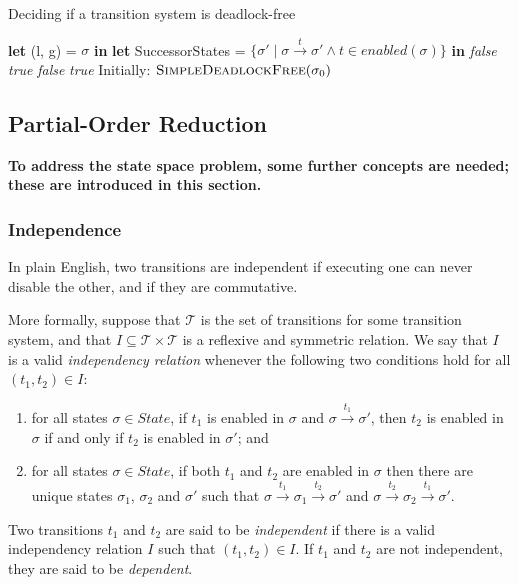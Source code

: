 \documentclass[12pt,a4paper,twoside,openright]{report}
\newcommand{\Let}[2]{\State \textbf{let} #1 = #2 \textbf{in}}
\begin{document}
\begin{algorithm} \caption{Deciding if a transition system is deadlock-free}
	\label{simple-deadlock-free} \begin{algorithmic}[1]
		\Let{(l, g)}{$\sigma$}
		\Let{SuccessorStates}{$\{\sigma' \mid \sigma \xrightarrow{t}
			\sigma' \wedge t \in \textit{enabled}(\sigma)\}$}
				 \Return \textit{false}
				\EndIf
			\EndFor
			\State \Return \textit{true}
		\Else
					\Return \textit{false}
				\EndIf
			\EndFor
		\State \Return \textit{true}
		\EndIf
		\EndProcedure
		\State
		\State Initially: $\textsc{SimpleDeadlockFree}(\sigma_0)$
	\end{algorithmic}
\end{algorithm}

\subsection{Partial-Order Reduction}
\textbf{To address the state space problem,
	some further concepts are needed; these
	are introduced in this section.}

\subsubsection{Independence} \label{sec:independence}
In plain English, two transitions are independent if executing one
can never disable the other, and if they are commutative.

More formally, suppose that $\mathcal{T}$ is the set of
transitions for some transition system, and
that $I \subseteq \mathcal{T} \times \mathcal{T}$
is a reflexive and symmetric relation. We say
that $I$ is a valid \emph{independency relation}
whenever the following two conditions hold for
all $(t_1, t_2) \in I$:
\begin{enumerate}
	\item for all states $\sigma \in \textit{State}$,
		if $t_1$ is enabled in $\sigma$ and
		$\sigma \xrightarrow{t_1} \sigma'$, then
		$t_2$ is enabled in $\sigma$ if and only if
		$t_2$ is enabled in $\sigma'$; and
	\item for all states $\sigma \in \textit{State}$,
		if both $t_1$ and $t_2$ are enabled in $\sigma$
		then there are unique states $\sigma_1$, $\sigma_2$ and
		$\sigma'$ such that
		$\sigma \xrightarrow{t_1} \sigma_1 \xrightarrow{t_2} \sigma'$
		and
		$\sigma \xrightarrow{t_2} \sigma_2 \xrightarrow{t_1} \sigma'$.
\end{enumerate}
Two transitions $t_1$ and $t_2$ are said to be \emph{independent}
if there is a valid independency relation $I$ such that $(t_1, t_2) \in I$.
If $t_1$ and $t_2$ are not independent, they are said to be \emph{dependent}.
\end{document}
